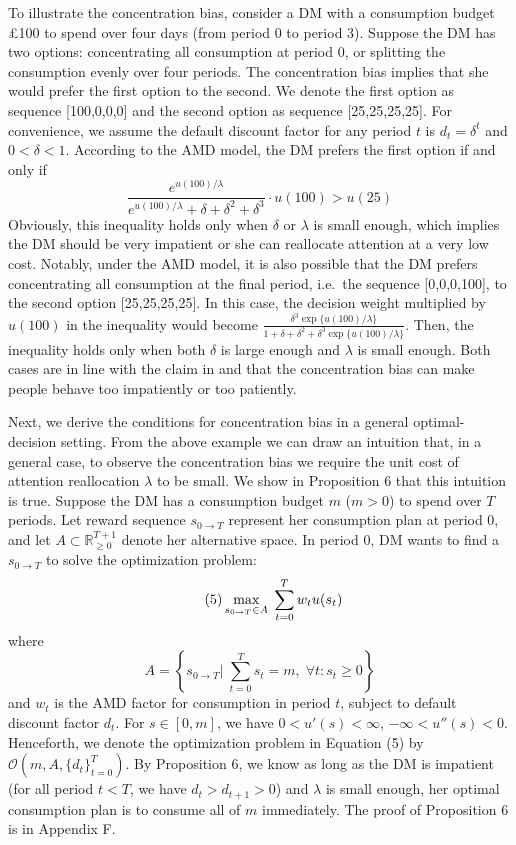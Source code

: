 \documentclass[
  12pt,
]{article}
\begin{document}
To illustrate the concentration bias, consider a DM with a consumption
budget £100 to spend over four days (from period 0 to period 3). Suppose
the DM has two options: concentrating all consumption at period 0, or
splitting the consumption evenly over four periods. The concentration
bias implies that she would prefer the first option to the second. We
denote the first option as sequence {[}100,0,0,0{]} and the second
option as sequence {[}25,25,25,25{]}. For convenience, we assume the
default discount factor for any period \(t\) is \(d_t = \delta^t\) and
\(0<\delta<1\). According to the AMD model, the DM prefers the first
option if and only if\[
\frac{e^{u(100)/\lambda}}{e^{u(100)/\lambda}+\delta+\delta^2+\delta^3}\cdot u(100)>u(25)
\]Obviously, this inequality holds only when \(\delta\) or \(\lambda\)
is small enough, which implies the DM should be very impatient or she
can reallocate attention at a very low cost. Notably, under the AMD
model, it is also possible that the DM prefers concentrating all
consumption at the final period, i.e.~the sequence {[}0,0,0,100{]}, to
the second option {[}25,25,25,25{]}. In this case, the decision weight
multiplied by \(u(100)\) in the inequality would become
\(\frac{\delta^3 \exp\{u(100)/\lambda\}}{1+\delta+\delta^2+\delta^3 \exp\{u(100)/\lambda\}}\).
Then, the inequality holds only when both \(\delta\) is large enough and
\(\lambda\) is small enough. Both cases are in line with the claim in
\citet{kHoszegi2013model} and \citet{dertwinkel2022concentration} that
the concentration bias can make people behave too impatiently or too
patiently.

Next, we derive the conditions for concentration bias in a general
optimal-decision setting. From the above example we can draw an
intuition that, in a general case, to observe the concentration bias we
require the unit cost of attention reallocation \(\lambda\) to be small.
We show in Proposition 6 that this intuition is true. Suppose the DM has
a consumption budget \(m\) (\(m>0\)) to spend over \(T\) periods. Let
reward sequence \(s_{0\rightarrow T}\) represent her consumption plan at
period 0, and let \(A\subset \mathbb{R}_{\geq 0}^{T+1}\) denote her
alternative space. In period 0, DM wants to find a
\(s_{0\rightarrow T}\) to solve the optimization problem:\[\tag{5}
\max_{s_{0\rightarrow T}\in A}\;\sum_{t=0}^T w_t u(s_t)\\ 
\]where\[
A=\left\{s_{0\rightarrow T} \bigg|\;\sum_{t=0}^T s_t = m,\; \forall t:s_t \geq 0\right\}
\]and \(w_t\) is the AMD factor for consumption in period \(t\), subject
to default discount factor \(d_t\). For \(s\in[0,m]\), we have
\(0<u'(s)<\infty\), \(-\infty<u''(s)<0\). Henceforth, we denote the
optimization problem in Equation (5) by
\(\mathcal{O}(m,A,\{d_t\}_{t=0}^T)\). By Proposition 6, we know as long
as the DM is impatient (for all period \(t<T\), we have
\(d_t>d_{t+1}>0\)) and \(\lambda\) is small enough, her optimal
consumption plan is to consume all of \(m\) immediately. The proof of
Proposition 6 is in Appendix F.
\end{document}
